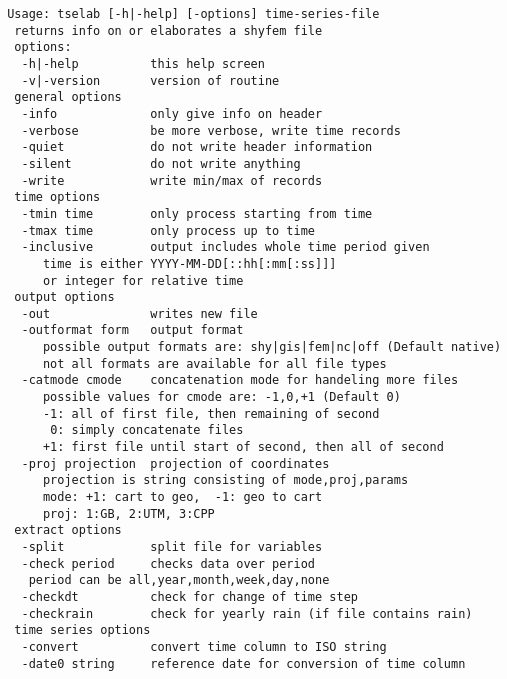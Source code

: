 \begin{verbatim}
 Usage: tselab [-h|-help] [-options] time-series-file
  returns info on or elaborates a shyfem file
  options:
   -h|-help          this help screen
   -v|-version       version of routine
  general options
   -info             only give info on header
   -verbose          be more verbose, write time records
   -quiet            do not write header information
   -silent           do not write anything
   -write            write min/max of records
  time options
   -tmin time        only process starting from time
   -tmax time        only process up to time
   -inclusive        output includes whole time period given
      time is either YYYY-MM-DD[::hh[:mm[:ss]]]
      or integer for relative time
  output options
   -out              writes new file
   -outformat form   output format
      possible output formats are: shy|gis|fem|nc|off (Default native)
      not all formats are available for all file types
   -catmode cmode    concatenation mode for handeling more files
      possible values for cmode are: -1,0,+1 (Default 0)
      -1: all of first file, then remaining of second
       0: simply concatenate files
      +1: first file until start of second, then all of second
   -proj projection  projection of coordinates
      projection is string consisting of mode,proj,params
      mode: +1: cart to geo,  -1: geo to cart
      proj: 1:GB, 2:UTM, 3:CPP
  extract options
   -split            split file for variables
   -check period     checks data over period
    period can be all,year,month,week,day,none
   -checkdt          check for change of time step
   -checkrain        check for yearly rain (if file contains rain)
  time series options
   -convert          convert time column to ISO string
   -date0 string     reference date for conversion of time column
\end{verbatim}

